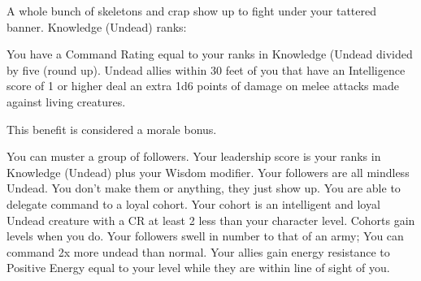 \skillfeat
{A whole bunch of skeletons and crap show up to fight under your tattered banner.}
{Knowledge (Undead) ranks:}
{You have a Command Rating equal to your ranks in Knowledge (Undead divided by five (round up). Undead allies within 30 feet of you that have an Intelligence score of 1 or higher deal an extra 1d6 points of damage on melee attacks made against living creatures.

This benefit is considered a morale bonus.}
{You can muster a group of followers. Your leadership score is your ranks in Knowledge (Undead) plus your Wisdom modifier. Your followers are all mindless Undead. You don't make them or anything, they just show up.}
{You are able to delegate command to a loyal cohort. Your cohort is an intelligent and loyal Undead creature with a CR at least 2 less than your character level. Cohorts gain levels when you do.}
{Your followers swell in number to that of an army; You can command 2x more undead than normal.}
{Your allies gain energy resistance to Positive Energy equal to your level while they are within line of sight of you.}